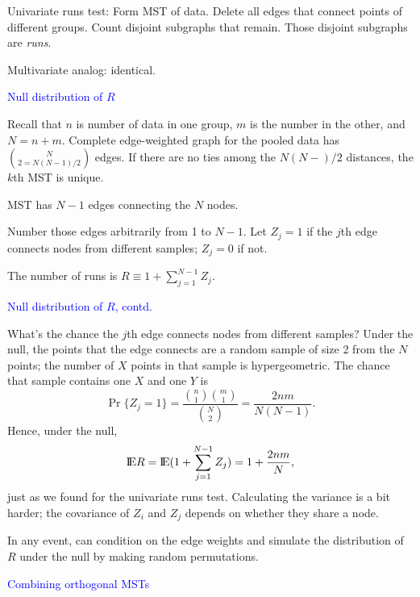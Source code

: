 \documentclass[landscape]{slides}
\newcommand{\EE}{\hbox{I\kern-.1667em\hbox{E}}}
\newcommand{\beq}{\begin{equation}}
\newcommand{\eeq}{\end{equation}}
\begin{document}
\begin{slide}
\begin{slide}
Univariate runs test: Form MST of data.  Delete all edges that connect points of different groups.
Count disjoint subgraphs that remain.
Those disjoint subgraphs are {\em runs\/}.

Multivariate analog: identical.

\end{slide}

\begin{slide}
{\textcolor{blue}{Null distribution of $R$}}

Recall that $n$ is number of data in one group, $m$ is the number in the other, and
$N = n+m$.
Complete edge-weighted graph for the pooled data has $N\choose{2} = N(N-1)/2$
edges.
If there are no ties among the $N(N-)/2$ distances, the $k$th MST is unique.

MST has $N-1$ edges connecting the $N$ nodes.

Number those edges arbitrarily from 1 to $N-1$.  Let $Z_j = 1$ if the $j$th edge connects
nodes from different samples; $Z_j = 0$ if not.

The number of runs is $R \equiv 1 + \sum_{j=1}^{N-1} Z_j$.

\end{slide}

\begin{slide}
{\textcolor{blue}{Null distribution of $R$, contd.}}

What's the chance the $j$th edge connects nodes from different samples?
Under the null, the points that the edge connects are a random sample of
size 2 from the $N$ points; the number of $X$ points in that sample is
hypergeometric.
The chance that sample contains one $X$ and one
$Y$ is
\beq
    \Pr \{ Z_j = 1 \} = \frac{ {{n}\choose{1}} {{m} \choose {1}}}{{{N}\choose{2}}}
         = \frac{2nm}{N(N-1)}.
\eeq
Hence, under the null,
\beq
   \EE R = \EE (1 + \sum_{j=1}^{N-1} Z_j) =  1 + \frac{2nm}{N},
\eeq
just as we found for the univariate runs test.
Calculating the variance is a bit harder; the covariance of $Z_i$ and $Z_j$ depends on
whether they share a node.

In any event, can condition on the edge weights and simulate the distribution of $R$ under
the null by making random permutations.

\end{slide}

\begin{slide}
{\textcolor{blue}{Combining orthogonal MSTs}}


\end{slide}
\end{slide}
\end{document}
